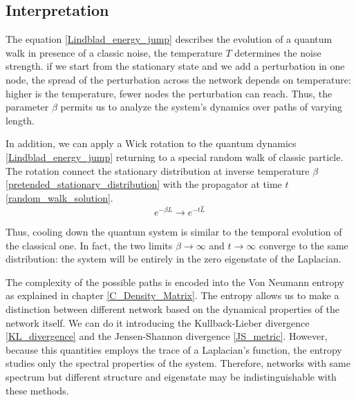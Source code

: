 \subsection{Interpretation}

The equation \eqref{Lindblad_energy_jump} describes the evolution of a quantum walk in presence of a classic noise, the temperature $T$ determines the noise strength.
if we start from the stationary state and we add a perturbation in one node, the spread of the perturbation across the network depends on temperature: higher is the temperature, fewer nodes the perturbation can reach. Thus, the parameter $\beta$ permits us to analyze the system's dynamics over paths of varying length.

In addition, we can apply a Wick rotation to the quantum dynamics \eqref{Lindblad_energy_jump} returning to a special random walk of classic particle. The rotation connect the stationary distribution at inverse temperature $\beta$ \eqref{pretended_stationary_distribution} with the propagator at time $t$ \eqref{random_walk_solution}.
\begin{equation}
    e^{-\beta\hat L} \rightarrow e^{-t\hat L}
\end{equation}

Thus, cooling down the quantum system is similar to the temporal evolution of the classical one. In fact, the two limits $\beta \rightarrow \infty$ and $t \rightarrow \infty$ converge to the same distribution: the system will be entirely in the zero eigenstate of the Laplacian.


The complexity of the possible paths is encoded into the Von Neumann entropy as explained in chapter \ref{C_Density_Matrix}.
The entropy allows us to make a distinction between different network based on the dynamical properties of the network itself. 
We can do it introducing the Kullback-Lieber divergence \eqref{KL_divergence} and the Jensen-Shannon divergence \eqref{JS_metric}.
However, because this quantities employs the trace of a Laplacian's function, the entropy studies only the spectral properties of the system. Therefore, networks with same spectrum but different structure and eigenstate may be indistinguishable with these methods.